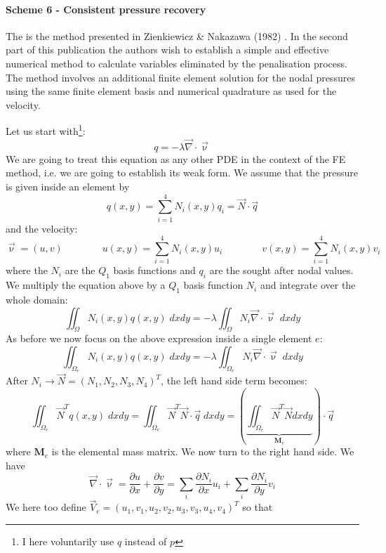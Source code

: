 \paragraph{Scheme 6 - Consistent pressure recovery}

The is the method presented in Zienkiewicz \& Nakazawa (1982) \cite{zina82}. In the second part 
of this publication the authors wish to establish a simple and effective numerical method to calculate 
variables eliminated by the penalisation process. 
The method involves an additional finite element solution for the nodal pressures using 
the same finite element basis and numerical quadrature as used for the velocity.

Let us start with\footnote{I here voluntarily use $q$ instead of $p$}:
\[
q = -\lambda \vec\nabla\cdot \vec\upnu
\]
We are going to treat this equation as any other PDE in the context of the FE method, i.e. 
we are going to establish its weak form. 
We assume that the pressure is given inside an element by
\[
q(x,y) = \sum_{i=1}^4 N_i(x,y) q_i = \vec{N} \cdot \vec{q}
\]
and the velocity:
\[
\vec\upnu = (u,v) 
\qquad 
\qquad 
u(x,y)  = \sum_{i=1}^4 N_i(x,y) u_i
\qquad 
\qquad 
v(x,y)  = \sum_{i=1}^4 N_i(x,y) v_i
\]
where the $N_i$ are the $Q_1$ basis functions and $q_i$ are the sought after nodal values. 
We multiply the equation above by a $Q_1$ basis function $N_i$ and integrate over the whole domain:
\[
\iint_\Omega N_i(x,y) q(x,y) \; dxdy = -\lambda \iint_\Omega N_i \vec\nabla\cdot \vec\upnu  \; dx dy
\]
As before we now focus on the above expression inside a single element $e$:
\[
\iint_{\Omega_e} N_i(x,y) q(x,y) \; dxdy = -\lambda \iint_{\Omega_e} N_i \vec\nabla\cdot \vec\upnu \; dx dy
\]
After $N_i \rightarrow \vec{N}=(N_1,N_2,N_3,N_4)^T$, the left hand side term becomes:
\[
\iint _{\Omega_e} \vec{N}^T q(x,y) \; dxdy 
=
\iint _{\Omega_e} \vec{N}^T \vec{N} \cdot \vec{q} \; dxdy 
=
\left(\underbrace{\iint _{\Omega_e} \vec{N}^T \vec{N} dxdy}_{{\bm M}_e} \right) \cdot \vec{q}  
\]
where ${\bm M}_e$ is the elemental mass matrix.
We now turn to the right hand side. We have
\[
\vec\nabla\cdot \vec\upnu
= \frac{\partial u}{\partial x}+\frac{\partial v}{\partial y}
= \sum_i \frac{\partial N_i}{\partial x} u_i + \sum_i \frac{\partial N_i}{\partial y} v_i 
\]
We here too define $\vec{V}_e=(u_1,v_1,u_2,v_2,u_3,v_3,u_4,v_4)^T$ so that 

